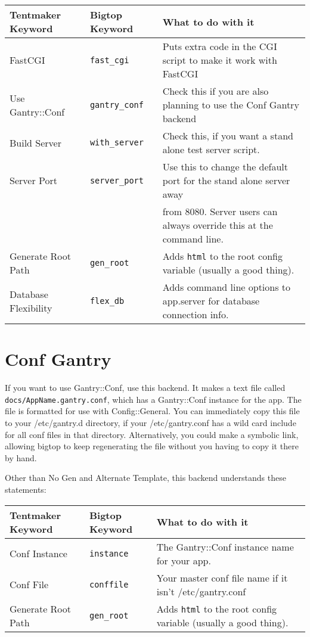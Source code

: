 \begin{tabular}{l|l|l}
Tentmaker Keyword & Bigtop Keyword & What to do with it \\
\hline
FastCGI           & \verb+fast_cgi+ &
    Puts extra code in the CGI script to make it work with FastCGI   \\

Use Gantry::Conf  & \verb+gantry_conf+ &
    Check this if you are also planning to use the Conf Gantry backend \\

Build Server      & \verb+with_server+ &
    Check this, if you want a stand alone test server script. \\

Server Port       & \verb+server_port+ &
    Use this to change the default port for the stand alone server away \\
& & from 8080.  Server users can always override this at the command line. \\

Generate Root Path & \verb+gen_root+ &
    Adds \verb+html+ to the root config variable (usually a good thing). \\    

Database Flexibility & \verb+flex_db+ &
    Adds command line options to app.server for database connection info. \\
\end{tabular}

\section{Conf Gantry}

If you want to use Gantry::Conf, use this backend.  It makes a text file
called \verb+docs/AppName.gantry.conf+, which has a Gantry::Conf instance
for the app.  The file is formatted for use with Config::General.  You can
immediately copy this file to your /etc/gantry.d directory, if your
/etc/gantry.conf has a wild card include for all conf files in that directory.
Alternatively, you could make a symbolic link, allowing bigtop to keep
regenerating the file without you having to copy it there by hand.

Other than No Gen and Alternate Template, this backend understands these
statements:

\begin{tabular}{l|l|l}
Tentmaker Keyword  & Bigtop Keyword & What to do with it \\
\hline
Conf Instance      & \verb+instance+ &
    The Gantry::Conf instance name for your app.  \\
Conf File          & \verb+conffile+ &
    Your master conf file name if it isn't /etc/gantry.conf \\
Generate Root Path & \verb+gen_root+ &
    Adds \verb+html+ to the root config variable (usually a good thing). \\    

\end{tabular}

